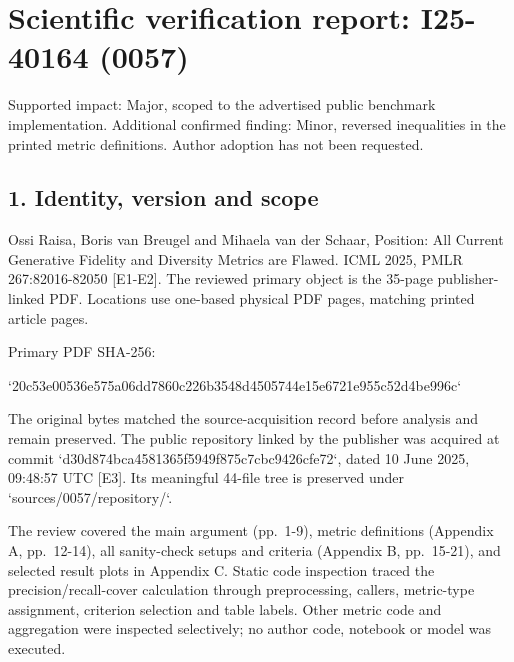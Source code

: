 \documentclass[10pt]{article}
\begin{document}
\section*{Scientific verification report: I25-40164 (0057)}
Supported impact: Major, scoped to the advertised public benchmark implementation. Additional confirmed finding: Minor, reversed inequalities in the printed metric definitions. Author adoption has not been requested.\par
\subsection*{1. Identity, version and scope}
Ossi Raisa, Boris van Breugel and Mihaela van der Schaar, Position: All Current Generative Fidelity and Diversity Metrics are Flawed. ICML 2025, PMLR 267:82016-82050 [E1-E2]. The reviewed primary object is the 35-page publisher-linked PDF. Locations use one-based physical PDF pages, matching printed article pages.\par
Primary PDF SHA-256:\par
`20c53e00536e575a06dd7860c226b3548d4505744e15e6721e955c52d4be996c`\par
The original bytes matched the source-acquisition record before analysis and remain preserved. The public repository linked by the publisher was acquired at commit `d30d874bca4581365f5949f875c7cbc9426cfe72`, dated 10 June 2025, 09:48:57 UTC [E3]. Its meaningful 44-file tree is preserved under `sources/0057/repository/`.\par
The review covered the main argument (pp. 1-9), metric definitions (Appendix A, pp. 12-14), all sanity-check setups and criteria (Appendix B, pp. 15-21), and selected result plots in Appendix C. Static code inspection traced the precision/recall-cover calculation through preprocessing, callers, metric-type assignment, criterion selection and table labels. Other metric code and aggregation were inspected selectively; no author code, notebook or model was executed.\par
\end{document}
